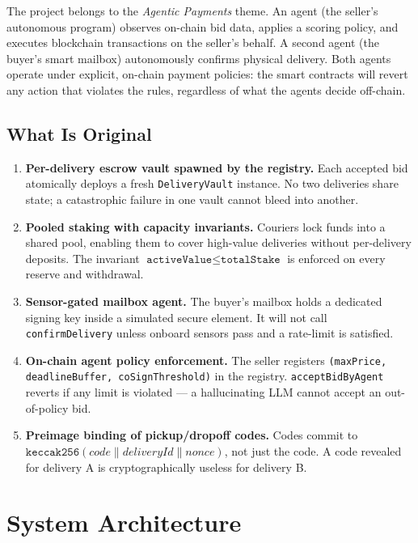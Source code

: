 \documentclass[12pt,a4paper]{article}
\begin{document}
The project belongs to the \emph{Agentic Payments} theme. An agent (the seller's autonomous program) observes on-chain bid data, applies a scoring policy, and executes blockchain transactions on the seller's behalf. A second agent (the buyer's smart mailbox) autonomously confirms physical delivery. Both agents operate under explicit, on-chain payment policies: the smart contracts will revert any action that violates the rules, regardless of what the agents decide off-chain.

\subsection{What Is Original}

\begin{enumerate}
    \item \textbf{Per-delivery escrow vault spawned by the registry.} Each accepted bid atomically deploys a fresh \texttt{DeliveryVault} instance. No two deliveries share state; a catastrophic failure in one vault cannot bleed into another.
    \item \textbf{Pooled staking with capacity invariants.} Couriers lock funds into a shared pool, enabling them to cover high-value deliveries without per-delivery deposits. The invariant $\texttt{activeValue} \leq \texttt{totalStake}$ is enforced on every reserve and withdrawal.
    \item \textbf{Sensor-gated mailbox agent.} The buyer's mailbox holds a dedicated signing key inside a simulated secure element. It will not call \texttt{confirmDelivery} unless onboard sensors pass and a rate-limit is satisfied.
    \item \textbf{On-chain agent policy enforcement.} The seller registers \texttt{(maxPrice, deadlineBuffer, coSignThreshold)} in the registry. \texttt{acceptBidByAgent} reverts if any limit is violated — a hallucinating LLM cannot accept an out-of-policy bid.
    \item \textbf{Preimage binding of pickup/dropoff codes.} Codes commit to $\mathtt{keccak256}(\mathit{code} \| \mathit{deliveryId} \| \mathit{nonce})$, not just the code. A code revealed for delivery A is cryptographically useless for delivery B.
\end{enumerate}

\section{System Architecture}
\end{document}
